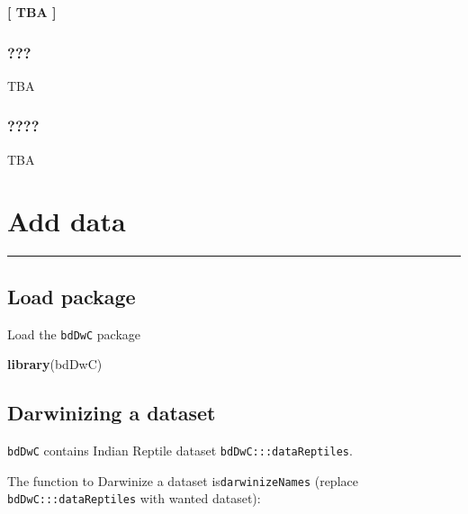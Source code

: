 \documentclass[]{book}
\newenvironment{Shaded}{\begin{snugshade}}{\end{snugshade}}
\newcommand{\KeywordTok}[1]{\textcolor[rgb]{0.13,0.29,0.53}{\textbf{#1}}}
\newcommand{\DataTypeTok}[1]{\textcolor[rgb]{0.13,0.29,0.53}{#1}}
\newcommand{\StringTok}[1]{\textcolor[rgb]{0.31,0.60,0.02}{#1}}
\newcommand{\OperatorTok}[1]{\textcolor[rgb]{0.81,0.36,0.00}{\textbf{#1}}}
\newcommand{\NormalTok}[1]{#1}
\begin{document}
\textbf{{{[} TBA {]}}}

\subsection{???}\label{section}

TBA

\subsection{????}\label{section-1}

TBA

\chapter{Add data}\label{add-data}

\begin{center}\rule{0.5\linewidth}{\linethickness}\end{center}

\section{Load package}\label{load-package}

Load the \texttt{bdDwC} package

\begin{Shaded}
\begin{Highlighting}[]
    \KeywordTok{library}\NormalTok{(bdDwC)}
\end{Highlighting}
\end{Shaded}

\section{Darwinizing a dataset}\label{darwinizing-a-dataset}

\texttt{bdDwC} contains Indian Reptile dataset
\texttt{bdDwC:::dataReptiles}.

The function to Darwinize a dataset is\texttt{darwinizeNames} (replace
\texttt{bdDwC:::dataReptiles} with wanted dataset):

\begin{Shaded}
\end{Shaded}
\end{document}
